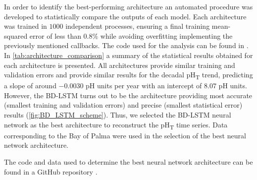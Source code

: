 \noindent In order to identify the best-performing architecture an
automated procedure was developed to statistically compare the outputs of each
model. Each architecture was trained in $1000$ independent processes, ensuring
a final training mean-squared error of less than $0.8\%$ while avoiding
overfitting implementing the previously mentioned callbacks. The code used for
the analysis can be found in \cite{CODE}.\\
In \cref{tab:architecture_comparison} a summary of the statistical results
obtained for each architecture is presented. All architectures provide similar
training and validation errors and provide similar results for the decadal
pH\textsubscript{T} trend, predicting a slope of around $-0.0030$ pH units per
year with an intercept of $8.07$ pH units. However, the BD-LSTM turns out to be
the architecture providing most accurate (smallest training and validation
errors) and precise (smallest statistical error) results
(\cref{fig:BD_LSTM_scheme}). Thus, we selected the BD-LSTM neural network as
the best architecture to reconstruct the pH\textsubscript{T} time series.
Data corresponding to the Bay of Palma were used in the selection of the
best neural network architecture.

\begin{table}[H]
    \centering
    \caption[Statistical comparison between different RNN
        architectures]{Statistical comparison between different RNN architectures}
    \label{tab:architecture_comparison}
\end{table}

\noindent The code and data used to determine the best neural network
architecture can be found in a GitHub repository \cite{CODE_ph}.
